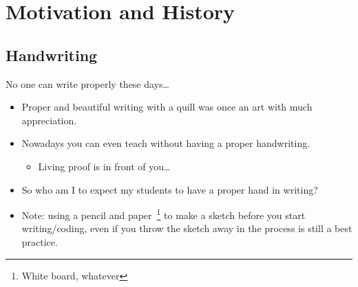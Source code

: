 \section{Motivation and History}
\subsection{Handwriting}
{
  \begin{frame}{No one can write properly these days\ldots}
    \begin{itemize}
    \item Proper and beautiful writing with a quill was once an art with
      much appreciation.
    \item Nowadays you can even teach without having a proper handwriting.
      \begin{itemize}
      \item Living proof is in front of you\ldots
      \end{itemize}

    \item So who am I to expect my students to have a proper hand in writing?

    \item Note: using a pencil and paper~\footnote{White board, whatever} to make a sketch before you start
      writing/coding, even if you throw the sketch away in the process is
      still a best practice.
    \end{itemize}

  \end{frame}
}

